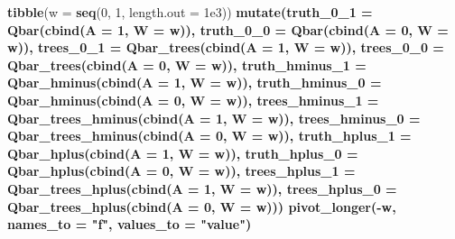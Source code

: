 \documentclass[11pt,openright,twoside]{book}
\newenvironment{Shaded}{\begin{snugshade}}{\end{snugshade}}
\newcommand{\DataTypeTok}[1]{\textcolor[rgb]{0.13,0.29,0.53}{#1}}
\newcommand{\DecValTok}[1]{\textcolor[rgb]{0.00,0.00,0.81}{#1}}
\newcommand{\FloatTok}[1]{\textcolor[rgb]{0.00,0.00,0.81}{#1}}
\newcommand{\KeywordTok}[1]{\textcolor[rgb]{0.13,0.29,0.53}{\textbf{#1}}}
\newcommand{\NormalTok}[1]{#1}
\newcommand{\OperatorTok}[1]{\textcolor[rgb]{0.81,0.36,0.00}{\textbf{#1}}}
\newcommand{\StringTok}[1]{\textcolor[rgb]{0.31,0.60,0.02}{#1}}
\theoremstyle{definition}
\theoremstyle{definition}
\theoremstyle{definition}
\theoremstyle{remark}
\begin{document}
\begin{Shaded}
\begin{Highlighting}[]
\KeywordTok{tibble}\NormalTok{(}\DataTypeTok{w =} \KeywordTok{seq}\NormalTok{(}\DecValTok{0}\NormalTok{, }\DecValTok{1}\NormalTok{, }\DataTypeTok{length.out =} \FloatTok{1e3}\NormalTok{)) }\OperatorTok{%
\StringTok{  }\KeywordTok{mutate}\NormalTok{(}\DataTypeTok{truth_0_1 =} \KeywordTok{Qbar}\NormalTok{(}\KeywordTok{cbind}\NormalTok{(}\DataTypeTok{A =} \DecValTok{1}\NormalTok{, }\DataTypeTok{W =}\NormalTok{ w)),}
         \DataTypeTok{truth_0_0 =} \KeywordTok{Qbar}\NormalTok{(}\KeywordTok{cbind}\NormalTok{(}\DataTypeTok{A =} \DecValTok{0}\NormalTok{, }\DataTypeTok{W =}\NormalTok{ w)),}
         \DataTypeTok{trees_0_1 =} \KeywordTok{Qbar_trees}\NormalTok{(}\KeywordTok{cbind}\NormalTok{(}\DataTypeTok{A =} \DecValTok{1}\NormalTok{, }\DataTypeTok{W =}\NormalTok{ w)),}
         \DataTypeTok{trees_0_0 =} \KeywordTok{Qbar_trees}\NormalTok{(}\KeywordTok{cbind}\NormalTok{(}\DataTypeTok{A =} \DecValTok{0}\NormalTok{, }\DataTypeTok{W =}\NormalTok{ w)),}
         \DataTypeTok{truth_hminus_1 =} \KeywordTok{Qbar_hminus}\NormalTok{(}\KeywordTok{cbind}\NormalTok{(}\DataTypeTok{A =} \DecValTok{1}\NormalTok{, }\DataTypeTok{W =}\NormalTok{ w)),}
         \DataTypeTok{truth_hminus_0 =} \KeywordTok{Qbar_hminus}\NormalTok{(}\KeywordTok{cbind}\NormalTok{(}\DataTypeTok{A =} \DecValTok{0}\NormalTok{, }\DataTypeTok{W =}\NormalTok{ w)),}
         \DataTypeTok{trees_hminus_1 =} \KeywordTok{Qbar_trees_hminus}\NormalTok{(}\KeywordTok{cbind}\NormalTok{(}\DataTypeTok{A =} \DecValTok{1}\NormalTok{, }\DataTypeTok{W =}\NormalTok{ w)),}
         \DataTypeTok{trees_hminus_0 =} \KeywordTok{Qbar_trees_hminus}\NormalTok{(}\KeywordTok{cbind}\NormalTok{(}\DataTypeTok{A =} \DecValTok{0}\NormalTok{, }\DataTypeTok{W =}\NormalTok{ w)),}
         \DataTypeTok{truth_hplus_1 =} \KeywordTok{Qbar_hplus}\NormalTok{(}\KeywordTok{cbind}\NormalTok{(}\DataTypeTok{A =} \DecValTok{1}\NormalTok{, }\DataTypeTok{W =}\NormalTok{ w)),}
         \DataTypeTok{truth_hplus_0 =} \KeywordTok{Qbar_hplus}\NormalTok{(}\KeywordTok{cbind}\NormalTok{(}\DataTypeTok{A =} \DecValTok{0}\NormalTok{, }\DataTypeTok{W =}\NormalTok{ w)),}
         \DataTypeTok{trees_hplus_1 =} \KeywordTok{Qbar_trees_hplus}\NormalTok{(}\KeywordTok{cbind}\NormalTok{(}\DataTypeTok{A =} \DecValTok{1}\NormalTok{, }\DataTypeTok{W =}\NormalTok{ w)),}
         \DataTypeTok{trees_hplus_0 =} \KeywordTok{Qbar_trees_hplus}\NormalTok{(}\KeywordTok{cbind}\NormalTok{(}\DataTypeTok{A =} \DecValTok{0}\NormalTok{, }\DataTypeTok{W =}\NormalTok{ w))) }\OperatorTok{%
\StringTok{  }\KeywordTok{pivot_longer}\NormalTok{(}\OperatorTok{-}\NormalTok{w, }\DataTypeTok{names_to =} \StringTok{"f"}\NormalTok{, }\DataTypeTok{values_to =} \StringTok{"value"}\NormalTok{) }\OperatorTok{%
}}}
\end{Highlighting}
\end{Shaded}
\end{document}
